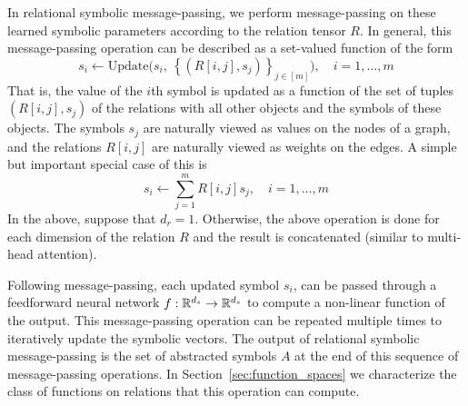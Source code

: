 In relational symbolic message-passing, we perform message-passing on these learned symbolic parameters according to the relation tensor $R$. In general, this message-passing operation can be described as a set-valued function of the form
\begin{equation}
    \label{eq:symbolic_message_passing}
    s_i \leftarrow \text{Update}\Big( s_i, \ \left\{ \left(R[i,j], s_j\right)\right\}_{j\in[m]}\Big), \quad i = 1, \ldots, m
\end{equation}
That is, the value of the $i$th symbol is updated as a function of the set of tuples $(R[i,j], s_j)$ of the relations with all other objects and the symbols of these objects. The symbols $s_j$ are naturally viewed
as values on the nodes of a graph, and the relations $R[i,j]$ are naturally viewed as weights on the edges. A simple but important special case of this is
\begin{equation}
    \label{eq:linear_symbolic_mp}
    s_i \leftarrow \sum_{j=1}^{m} R[i,j] s_j, \quad i=1, \ldots, m
\end{equation}
In the above, suppose that $d_r = 1$. Otherwise, the above operation is done for each dimension of the relation $R$ and the result is concatenated (similar to multi-head attention).

Following message-passing, each updated symbol $s_i$, can be passed through a feedforward neural network $f:\mathbb{R}^{d_s}\rightarrow \mathbb{R}^{d_s}$ to compute a non-linear function of the output. %
This message-passing operation can be repeated multiple times to iteratively update the symbolic vectors.  The output of relational symbolic message-passing is the set of abstracted symbols $A$ at the end of this sequence of message-passing operations. %
In Section~\ref{sec:function_spaces} we characterize the class of functions on relations that this operation can compute.

